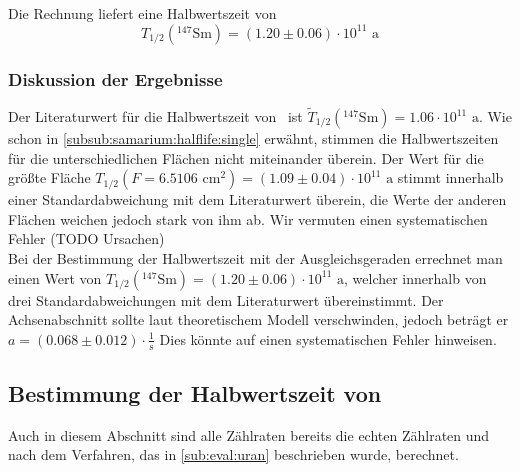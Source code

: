 Die Rechnung liefert eine Halbwertszeit von
\begin{equation}
  T_{1/2}({}^{147}\text{Sm}) = (1.20 \pm 0.06) \cdot 10^{11} \text{ a}
\end{equation}

\subsubsection{Diskussion der Ergebnisse}
Der Literaturwert für die Halbwertszeit von \samarium\, ist $\tilde{T}_{1/2}({}^{147}\text{Sm}) = 1.06 \cdot 10^{11} \text{ a}$.
Wie schon in \ref{subsub:samarium:halflife:single} erwähnt, stimmen die Halbwertszeiten für die unterschiedlichen Flächen nicht miteinander 
überein. Der Wert für die größte Fläche $T_{1/2}(F=6.5106 \text{ cm}^2) = (1.09 \pm 0.04)\cdot 10^{11} \text{ a}$ stimmt innerhalb einer 
Standardabweichung mit dem Literaturwert überein, die Werte der anderen Flächen weichen jedoch stark von ihm ab. Wir vermuten einen systematischen 
Fehler (TODO Ursachen) \\%
Bei der Bestimmung der Halbwertszeit mit der Ausgleichsgeraden errechnet man einen Wert von 
$T_{1/2}({}^{147}\text{Sm}) = (1.20 \pm 0.06) \cdot 10^{11} \text{ a}$, welcher innerhalb von drei Standardabweichungen mit dem Literaturwert 
übereinstimmt. Der Achsenabschnitt sollte laut theoretischem Modell verschwinden, jedoch beträgt er $a = (0.068  \pm 0.012 ) \cdot \frac{1}{\text{s}}$
Dies könnte auf einen systematischen Fehler hinweisen.

\subsection{Bestimmung der Halbwertszeit von \kalium}
Auch in diesem Abschnitt sind alle Zählraten bereits die echten Zählraten und nach dem Verfahren, das in \ref{sub:eval:uran} beschrieben wurde, 
berechnet.

